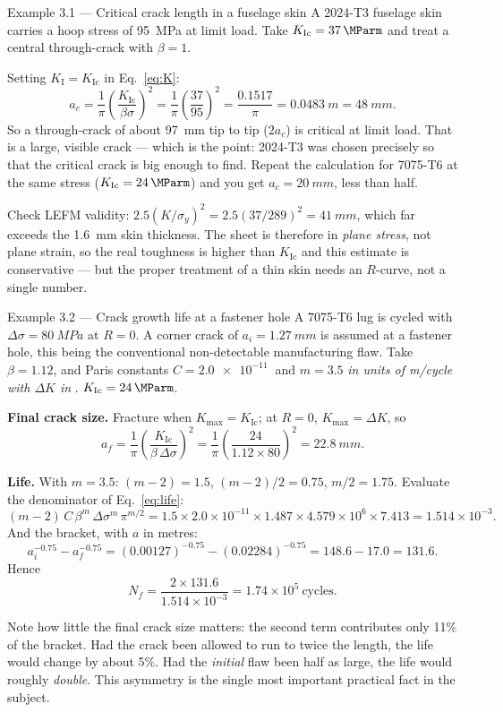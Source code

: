 \documentclass[11pt,a4paper]{article}
\begin{document}
\begin{examplebox}{Example 3.1 --- Critical crack length in a fuselage skin}
A 2024-T3 fuselage skin carries a hoop stress of \SI{95}{MPa} at limit load. Take $K_{\mathrm{Ic}}=\SI{37}{\MParm}$ and treat a central through-crack with $\beta=1$.

Setting $K_{\mathrm{I}}=K_{\mathrm{Ic}}$ in Eq.~\eqref{eq:K}:
\[
a_c=\frac{1}{\pi}\left(\frac{K_{\mathrm{Ic}}}{\beta\sigma}\right)^{2}
=\frac{1}{\pi}\left(\frac{37}{95}\right)^{2}=\frac{0.1517}{\pi}=\SI{0.0483}{m}=\SI{48}{mm}.
\]
So a through-crack of about \SI{97}{mm} tip to tip ($2a_c$) is critical at limit load. That is a large, visible crack --- which is the point: 2024-T3 was chosen precisely so that the critical crack is big enough to find. Repeat the calculation for 7075-T6 at the same stress ($K_{\mathrm{Ic}}=\SI{24}{\MParm}$) and you get $a_c=\SI{20}{mm}$, less than half.

Check LEFM validity: $2.5(K/\sigma_y)^2=2.5(37/289)^2=\SI{41}{mm}$, which far exceeds the \SI{1.6}{mm} skin thickness. The sheet is therefore in \emph{plane stress}, not plane strain, so the real toughness is higher than $K_{\mathrm{Ic}}$ and this estimate is conservative --- but the proper treatment of a thin skin needs an $R$-curve, not a single number.
\end{examplebox}

\begin{examplebox}{Example 3.2 --- Crack growth life at a fastener hole}
A 7075-T6 lug is cycled with $\Delta\sigma=\SI{80}{MPa}$ at $R=0$. A corner crack of $a_i=\SI{1.27}{mm}$ is assumed at a fastener hole, this being the conventional non-detectable manufacturing flaw. Take $\beta=1.12$, and Paris constants $C=\SI{2.0e-11}{}$ and $m=3.5$ \emph{in units of \si{m/cycle} with $\Delta K$ in \si{\MParm}}. $K_{\mathrm{Ic}}=\SI{24}{\MParm}$.

\textbf{Final crack size.} Fracture when $K_{\max}=K_{\mathrm{Ic}}$; at $R=0$, $K_{\max}=\Delta K$, so
\[
a_f=\frac{1}{\pi}\left(\frac{K_{\mathrm{Ic}}}{\beta\,\Delta\sigma}\right)^{2}
=\frac{1}{\pi}\left(\frac{24}{1.12\times80}\right)^{2}=\SI{22.8}{mm}.
\]

\textbf{Life.} With $m=3.5$: $(m-2)=1.5$, $(m-2)/2=0.75$, $m/2=1.75$. Evaluate the denominator of Eq.~\eqref{eq:life}:
\[
(m-2)\,C\,\beta^{m}\,\Delta\sigma^{m}\,\pi^{m/2}
=1.5\times2.0\times10^{-11}\times1.487\times4.579\times10^{6}\times7.413
=1.514\times10^{-3}.
\]
And the bracket, with $a$ in metres:
\[
a_i^{-0.75}-a_f^{-0.75}=(0.00127)^{-0.75}-(0.02284)^{-0.75}=148.6-17.0=131.6 .
\]
Hence
\[
N_f=\frac{2\times131.6}{1.514\times10^{-3}}=1.74\times10^{5}\ \text{cycles}.
\]

Note how little the final crack size matters: the second term contributes only 11\% of the bracket. Had the crack been allowed to run to twice the length, the life would change by about 5\%. Had the \emph{initial} flaw been half as large, the life would roughly \emph{double}. This asymmetry is the single most important practical fact in the subject.
\end{examplebox}
\end{document}
